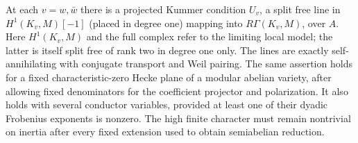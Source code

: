 \begin{lemma}\label{split-local:dyadic-lines}
At each \(v=w,\bar w\) there is a projected Kummer condition \(U_v\), a split free line in \(H^1(K_v,M)[-1]\) (placed in degree one) mapping into \(R\Gamma(K_v,M)\), over \(A\). Here \(H^1(K_v,M)\) and the full complex refer to the limiting local model; the latter is itself split free of rank two in degree one only. The lines are exactly self-annihilating with conjugate transport and Weil pairing. The same assertion holds for a fixed characteristic-zero Hecke plane of a modular abelian variety, after allowing fixed denominators for the coefficient projector and polarization. It also holds with several conductor variables, provided at least one of their dyadic Frobenius exponents is nonzero. The high finite character must remain nontrivial on inertia after every fixed extension used to obtain semiabelian reduction.
\end{lemma}

